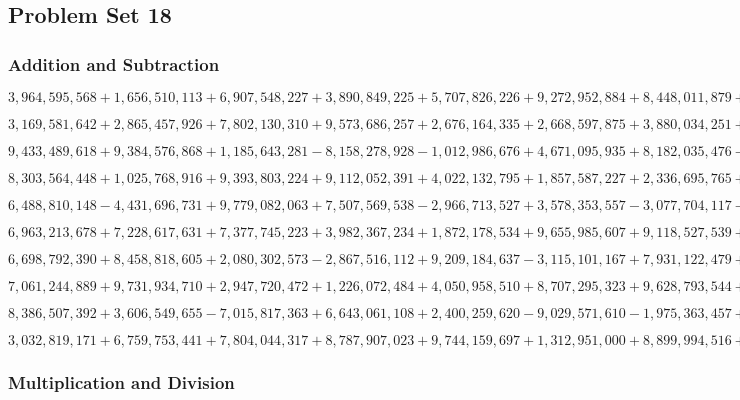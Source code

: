 \hypertarget{problem-set-18-6}{%
\subsection{Problem Set 18}\label{problem-set-18-6}}

\hypertarget{addition-and-subtraction-398}{%
\subsubsection{Addition and
Subtraction}\label{addition-and-subtraction-398}}

\(3,964,595,568+1,656,510,113+6,907,548,227+3,890,849,225+5,707,826,226+9,272,952,884+8,448,011,879+5,635,852,078+5,409,911,053+2,541,730,632\)

\(3,169,581,642+2,865,457,926+7,802,130,310+9,573,686,257+2,676,164,335+2,668,597,875+3,880,034,251+4,386,656,898+8,147,370,003+4,119,819,039\)

\(9,433,489,618+9,384,576,868+1,185,643,281-8,158,278,928-1,012,986,676+4,671,095,935+8,182,035,476-9,944,516,921-7,459,553,108+2,318,448,914\)

\(8,303,564,448+1,025,768,916+9,393,803,224+9,112,052,391+4,022,132,795+1,857,587,227+2,336,695,765+9,436,350,249+3,435,406,021+7,232,783,621\)

\(6,488,810,148-4,431,696,731+9,779,082,063+7,507,569,538-2,966,713,527+3,578,353,557-3,077,704,117-2,105,421,463+7,402,341,933+8,387,929,036\)

\(6,963,213,678+7,228,617,631+7,377,745,223+3,982,367,234+1,872,178,534+9,655,985,607+9,118,527,539+8,548,976,158+8,820,272,775+8,122,568,241\)

\(6,698,792,390+8,458,818,605+2,080,302,573-2,867,516,112+9,209,184,637-3,115,101,167+7,931,122,479+5,859,438,717-9,341,246,628-6,483,360,662\)

\(7,061,244,889+9,731,934,710+2,947,720,472+1,226,072,484+4,050,958,510+8,707,295,323+9,628,793,544+4,817,521,247+9,869,676,493+9,381,947,595\)

\(8,386,507,392+3,606,549,655-7,015,817,363+6,643,061,108+2,400,259,620-9,029,571,610-1,975,363,457+7,398,861,792+7,184,942,287-4,474,071,955\)

\(3,032,819,171+6,759,753,441+7,804,044,317+8,787,907,023+9,744,159,697+1,312,951,000+8,899,994,516+8,308,096,162+8,775,549,047+5,552,578,450\)

\hypertarget{multiplication-and-division-396}{%
\subsubsection{Multiplication and
Division}\label{multiplication-and-division-396}}

